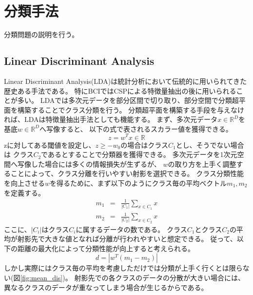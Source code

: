 \section{分類手法}
分類問題の説明を行う。

\subsection{Linear Discriminant Analysis}
\label{subsec:LDA}
Linear Discriminant Analysis(LDA)は統計分析において伝統的に用いられてきた歴史ある手法である。
特にBCIではCSPによる特徴量抽出の後に用いられることが多い。
LDAでは多次元データを部分区間で切り取り、部分空間で分類超平面を構築することでクラス分類を行う。
分類超平面を構築する手段を与えなければ、LDAは特徴量抽出手法としても機能する。
まず、多次元データ\(x\in \mathbb R^D\)を基底\(w \in \mathbb R^D\)へ写像すると、
以下の式で表されるスカラー値を獲得できる。
\begin{equation}
    z = w^Tx \in \mathbb R
\end{equation}
zに対してある閾値を設定し、\(z \geq -w_0\)の場合はクラス\(C_1\)とし、そうでない場合は
クラス\(C_2\)であるとすることで分類器を獲得できる。
多次元データを1次元空間へ写像した場合には多くの情報損失が生ずるが、
\(w\)の取り方を上手く調整することによって、クラス分離を行いやすい射影を選択できる。
クラス分類性能を向上させる\(w\)を得るために、まず以下のようにクラス毎の平均ベクトル\(m_1,m_2\)を定義する。
\begin{eqnarray}
    m_{1} & = & \frac{1}{|C_1|}\sum_{x\in C_1}x \nonumber \\
    m_{2} & = & \frac{1}{|C_2|}\sum_{x\in C_2}x
\end{eqnarray}
ここに、\(|C_i|\)はクラス\(C_i\)に属するデータの数である。
クラス\(C_1\)とクラス\(C_2\)の平均が射影先で大きな値となれば分離が行われやすいと想定できる。
従って、以下の距離の最大化によって分類性能が向上すると考えられる。
\begin{equation}
    d=|w^T(m_1-m_2)|
    \label{eq:dis}
\end{equation}
しかし実際にはクラス毎の平均を考慮しただけでは分類が上手く行くとは限らない(図\ref{fig:mean_dis})。
射影先での各クラスのデータの分散が大きい場合には、異なるクラスのデータが重なってしまう場合が生じるからである。
